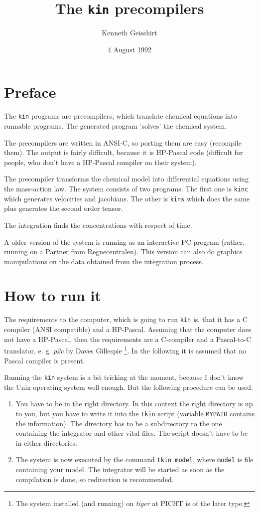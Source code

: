 \author{Kenneth Geisshirt}
\title{The {\tt kin} precompilers}
\date{4 August 1992}

\maketitle
\section{Preface}
The {\tt kin} programs are precompilers, which translate chemical equations 
into runnable programs. The generated program 'solves' the chemical system.

The precompilers are written in ANSI-C, so porting them are easy (recompile them).
The output is fairly difficult, because it is HP-Pascal code (difficult for people, who
don't have a HP-Pascal compiler on their system). 

The precompiler transforms the chemical model into differential equations using the
mass-action law. The system consists of two programs. The first one is {\tt kinc}
which generates velocities and jacobians. The other is {\tt kins} which does
the same plus generates the second order tensor. 

The integration finds the concentrations with respect of time.

A older version of the system is running as an interactive PC-program (rather,
running on a Partner from Regnecentralen). This version can also do graphics 
manipulations on the data obtained from the integration process.

\section{How to run it}
The requirements to the computer, which is going to run {\tt kin} is, that it 
has a C compiler (ANSI compatible) and a HP-Pascal. Assuming that the computer 
does not have a HP-Pascal, then the requirements are a C-compiler and a  
Pascal-to-C translator, e. g. {\em p2c} by Daves Gillespie \footnote{The system
installed (and running) on {\em tiger} at PICHT is of the later type.}. In the following
it is assumed that no Pascal compiler is present.

Running the {\tt kin} system is a bit tricking at the moment, because I don't know
the Unix operating system well enough. But the following procedure can be used. 
\begin{enumerate}
 \item You have to be in the right directory. In this context the right directory
       is up to you, but you have to write it into the {\tt tkin} script (variable
       {\tt MYPATH} contains the information).
       The directory has to be a subdirectory to the one containing the integrator and
       other vital files. The script doesn't have to be in either directories.    
 \item The system is now executed by the command {\tt tkin model}, where {\tt model} is
       file containing your model. The integrator will be started as soon as the compilation
       is done, so redirection is recommended.
\end{enumerate}

